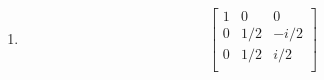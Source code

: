 \documentclass[12pt]{article}
\begin{document}
{\begin{enumerate}[label=(\alph*)]
\begin{align*}
\begin{bmatrix}
            0 & e^{2i} & 1 \\
            0 & e^{2i} & 0 \\
            1 & 0 & 0
          \end{bmatrix}
          \sim
          \begin{bmatrix}
            0 & 0 & 1 \\
            0 & e^{2i} & 0 \\
            1 & 0 & 0
          \end{bmatrix}
          \sim
          \begin{bmatrix}
            0 & 0 & 1 \\
            0 & 1 & 0 \\
            1 & 0 & 0
          \end{bmatrix}
        \end{align*}

        So $\{f_1, f_2, f_3\}$ are linearly independent.

      \item 
        \[
          \begin{bmatrix}
            1 & 0 & 0 \\
            0 & 1/2 & -i/2 \\
            0 & 1/2 & i/2 \\
          \end{bmatrix}
        \]
    \end{enumerate}
  }
\end{document}
